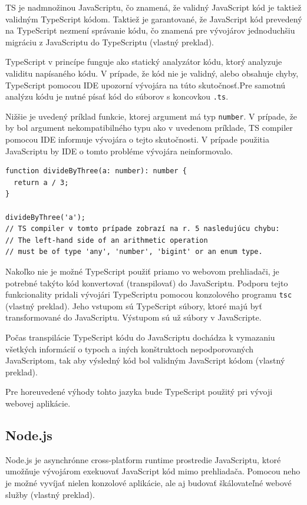 TS je nadmnožinou JavaScriptu, čo znamená, že validný JavaScript kód je taktiež validným TypeScript kódom. Taktiež je garantované, že JavaScript kód prevedený na TypeScript nezmení správanie kódu, čo znamená pre vývojárov jednoduchšiu migráciu z JavaScriptu do TypeScriptu \cite{about_typescript} (vlastný preklad).

TypeScript v princípe funguje ako statický analyzátor kódu, ktorý analyzuje validitu napísaného kódu. V prípade, že kód nie je validný, alebo obsahuje chyby, TypeScript pomocou IDE upozorní vývojára na túto skutočnosť.\newline Pre samotnú analýzu kódu je nutné písať kód do súborov s koncovkou \texttt{.ts}.

\clearpage

Nižšie je uvedený príklad funkcie, ktorej argument má typ \texttt{number}. V prípade, že by bol argument nekompatibilného typu ako v uvedenom príklade, TS compiler pomocou IDE informuje vývojára o tejto skutočnosti. V prípade použitia JavaScriptu by IDE o tomto probléme vývojára neinformovalo. 
\begin{verbatim}
function divideByThree(a: number): number {
  return a / 3;
}

divideByThree('a');
// TS compiler v tomto prípade zobrazí na r. 5 nasledujúcu chybu:
// The left-hand side of an arithmetic operation
// must be of type 'any', 'number', 'bigint' or an enum type.
\end{verbatim}

Nakoľko nie je možné TypeScript použiť priamo vo webovom prehliadači, je potrebné takýto kód konvertovať (transpilovať) do JavaScriptu. Podporu tejto funkcionality pridali vývojári TypeScriptu pomocou konzolového programu \texttt{tsc} \cite{about_typescript} (vlastný preklad). Jeho vstupom sú TypeScript súbory, ktoré majú byť transformované do JavaScriptu. Výstupom sú už súbory v JavaScripte.

Počas transpilácie TypeScript kódu do JavaScriptu dochádza k vymazaniu všetkých informácií o typoch a iných konštruktoch nepodporovaných JavaScriptom, tak aby výsledný kód bol validným JavaScript kódom \cite{about_typescript} (vlastný preklad).

Pre horeuvedené výhody tohto jazyka bude TypeScript použitý pri vývoji webovej aplikácie.

\subsection {Node.js}
Node.js je asynchrónne cross-platform runtime prostredie JavaScriptu, ktoré umožňuje vývojárom exekuovať JavaScript kód mimo prehliadača. Pomocou neho je možné vyvíjať nielen konzolové aplikácie, ale aj budovať škálovateľné webové služby \cite{about_nodejs} (vlastný preklad).


